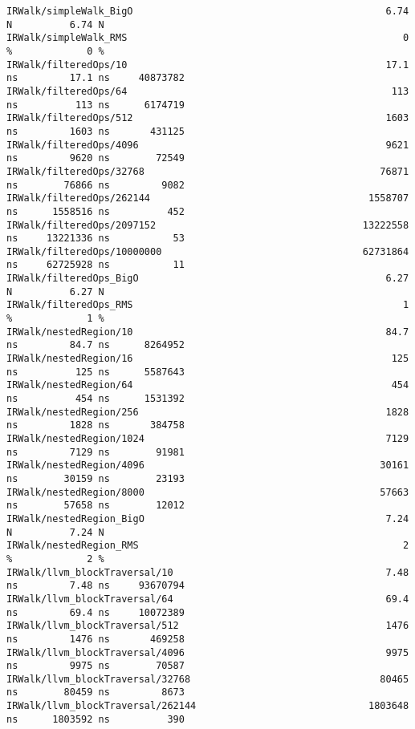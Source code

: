\begin{code}
\begin{verbatim}
IRWalk/simpleWalk_BigO                                            6.74 N          6.74 N
IRWalk/simpleWalk_RMS                                                0 %             0 %
IRWalk/filteredOps/10                                             17.1 ns         17.1 ns     40873782
IRWalk/filteredOps/64                                              113 ns          113 ns      6174719
IRWalk/filteredOps/512                                            1603 ns         1603 ns       431125
IRWalk/filteredOps/4096                                           9621 ns         9620 ns        72549
IRWalk/filteredOps/32768                                         76871 ns        76866 ns         9082
IRWalk/filteredOps/262144                                      1558707 ns      1558516 ns          452
IRWalk/filteredOps/2097152                                    13222558 ns     13221336 ns           53
IRWalk/filteredOps/10000000                                   62731864 ns     62725928 ns           11
IRWalk/filteredOps_BigO                                           6.27 N          6.27 N
IRWalk/filteredOps_RMS                                               1 %             1 %
IRWalk/nestedRegion/10                                            84.7 ns         84.7 ns      8264952
IRWalk/nestedRegion/16                                             125 ns          125 ns      5587643
IRWalk/nestedRegion/64                                             454 ns          454 ns      1531392
IRWalk/nestedRegion/256                                           1828 ns         1828 ns       384758
IRWalk/nestedRegion/1024                                          7129 ns         7129 ns        91981
IRWalk/nestedRegion/4096                                         30161 ns        30159 ns        23193
IRWalk/nestedRegion/8000                                         57663 ns        57658 ns        12012
IRWalk/nestedRegion_BigO                                          7.24 N          7.24 N
IRWalk/nestedRegion_RMS                                              2 %             2 %
IRWalk/llvm_blockTraversal/10                                     7.48 ns         7.48 ns     93670794
IRWalk/llvm_blockTraversal/64                                     69.4 ns         69.4 ns     10072389
IRWalk/llvm_blockTraversal/512                                    1476 ns         1476 ns       469258
IRWalk/llvm_blockTraversal/4096                                   9975 ns         9975 ns        70587
IRWalk/llvm_blockTraversal/32768                                 80465 ns        80459 ns         8673
IRWalk/llvm_blockTraversal/262144                              1803648 ns      1803592 ns          390

\end{verbatim}
\end{code}
